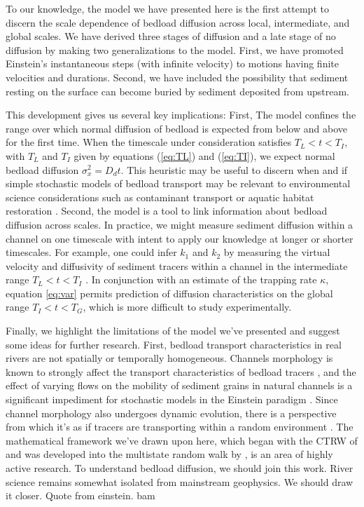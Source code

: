 \documentclass[]{agujournal2018}
\begin{document}
To our knowledge, the model we have presented here is the first attempt to discern the scale dependence of bedload diffusion across local, intermediate, and global scales.
We have derived three stages of diffusion and a late stage of no diffusion by making two generalizations to the \citet{Einstein1937} model.
First, we have promoted Einstein's instantaneous steps (with infinite velocity) to motions having finite velocities and durations. Second, we have included the possibility that sediment resting on the surface can become buried by sediment deposited from upstream.


This development gives us several key implications:
First, The model confines the range over which normal diffusion of bedload is expected from below and above for the first time. When the timescale under consideration satisfies $T_L<t<T_I$, with $T_L$ and $T_I$ given by equations (\ref{eq:TL}) and (\ref{eq:TI}), we expect normal bedload diffusion $\sigma_x^2 = D_dt$. This heuristic may be useful to discern when and if simple stochastic models of bedload transport may be relevant to environmental science considerations such as contaminant transport \citep{Macklin2006} or aquatic habitat restoration \citep[e.g.][]{Gaeuman2017}.
Second, the model is a tool to link information about bedload diffusion across scales. In practice, we might measure sediment diffusion within a channel on one timescale with intent to apply our knowledge at longer or shorter timescales. For example, one could infer $k_1$ and $k_2$ by measuring the virtual velocity and diffusivity of sediment tracers within a channel in the intermediate range $T_L<t<T_I$ \citep[e.g.][]{Hassan2017}. In conjunction with an estimate of the trapping rate $\kappa$, equation \ref{eq:var} permits prediction of diffusion characteristics on the global range $T_I<t<T_G$, which is more difficult to study experimentally.

Finally, we highlight the limitations of the model we've presented and suggest some ideas for further research.
First, bedload transport characteristics in real rivers are not spatially or temporally homogeneous.
Channels morphology is known to strongly affect the transport characteristics of bedload tracers \citep[e.g.][]{Kasprak2014,Hassan2017}, and the effect of varying flows on the mobility of sediment grains in natural channels is a significant impediment for stochastic models in the Einstein paradigm \citep{Phillips2013,Bradley2012}.
Since channel morphology also undergoes dynamic evolution, there is a perspective from which it's as if tracers are transporting within a random environment \citep[cf.][]{Solokev2012}.
The mathematical framework we've drawn upon here, which began with the CTRW of \citet{Montroll1965} and was developed into the multistate random walk by \citet{Weiss1972, Weiss1994}, is an area of highly active research.
To understand bedload diffusion, we should join this work.
River science remains somewhat isolated from mainstream geophysics. 
We should draw it closer.
Quote from einstein.
bam
\end{document}
